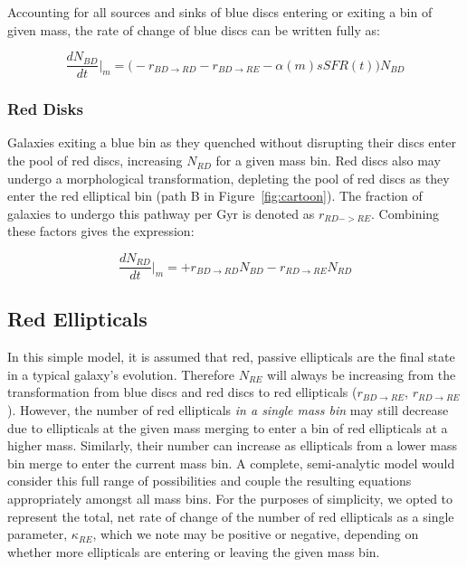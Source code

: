 \documentclass[useAMS,usenatbib]{mn2e}
\begin{document}
Accounting for all sources and sinks of blue discs entering or exiting a bin of given mass, the rate of change of blue discs can be written fully as:

\begin{equation}
\frac{dN_{BD}}{dt}\Big\rvert_{m} = \Big(-r_{BD \rightarrow RD} - r_{BD\rightarrow RE} -\alpha(m) sSFR(t) \Big)N_{BD}
\label{eqn:BD}
\end{equation}

\subsubsection{Red Disks}
Galaxies exiting a blue bin as they quenched without disrupting their discs enter the pool of red discs, increasing $N_{RD}$ for a given mass bin. Red discs also may undergo a morphological transformation, depleting the pool of red discs as they enter the red elliptical bin (path B in Figure~\ref{fig:cartoon}). The fraction of galaxies to undergo this pathway per Gyr is denoted as $r_{RD->RE}$. Combining these factors gives the expression: 

\begin{equation}
\frac{dN_{RD}}{dt}\Big\rvert_{m} = + r_{BD \rightarrow RD}N_{BD} - r_{RD \rightarrow RE}N_{RD}
\label{eqn:RD}
\end{equation}

\subsection{Red Ellipticals}
In this simple model, it is assumed that red, passive ellipticals are the final state in a typical galaxy's evolution. Therefore $N_{RE}$ will always be increasing from the transformation from blue discs and red discs to red ellipticals ($r_{BD \rightarrow RE}$, $r_{RD \rightarrow RE}$). However, the number of red ellipticals \emph{in a single mass bin} may still decrease due to ellipticals at the given mass merging to enter a bin of red ellipticals at a higher mass. Similarly, their number can increase as ellipticals from a lower mass bin merge to enter the current mass bin. A complete, semi-analytic model would consider this full range of possibilities and couple the resulting equations appropriately amongst all mass bins. For the purposes of simplicity, we opted to represent the total, net rate of change of the number of red ellipticals as a single parameter, $\kappa_{RE}$, which we note may be positive or negative, depending on whether more ellipticals are entering or leaving the given mass bin. 
\end{document}
